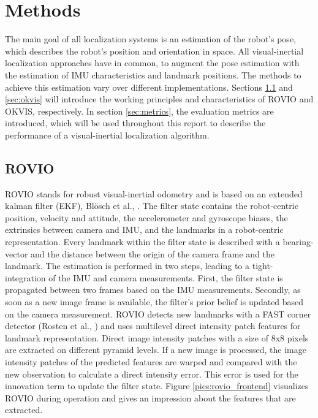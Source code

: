 \chapter{Methods}
\label{sec:methods}

The main goal of all localization systems is an estimation of the robot's pose, which describes the robot's position and orientation in space. All visual-inertial localization approaches have in common, to augment the pose estimation with the estimation of IMU characteristics and landmark positions. The methods to achieve this estimation vary over different implementations. Sections \ref{sec:rovio} and \ref{sec:okvis} will introduce the working principles and characteristics of ROVIO and OKVIS, respectively. In section \ref{sec:metrics}, the evaluation metrics are introduced, which will be used throughout this report to describe the performance of a visual-inertial localization algorithm.

\section{ROVIO}
\label{sec:rovio}

ROVIO stands for robust visual-inertial odometry and is based on an extended kalman filter (EKF), Blösch et al., \cite{bloeschrobust}. The filter state contains the robot-centric position, velocity and attitude, the accelerometer and gyroscope biases, the extrinsics between camera and IMU, and the landmarks in a robot-centric representation. Every landmark within the filter state is described with a bearing-vector and the distance between the origin of the camera frame and the landmark. The estimation is performed in two steps, leading to a tight-integration of the IMU and camera measurements. First, the filter state is propagated between two frames based on the IMU measurements. Secondly, as soon as a new image frame is available, the filter's prior belief is updated based on the camera measurement. ROVIO detects new landmarks with a FAST corner detector (Rosten et al., \cite{rosten2006machine}) and uses multilevel direct intensity patch features for landmark representation. Direct image intensity patches with a size of 8x8 pixels are extracted on different pyramid levels. If a new image is processed, the image intensity patches of the predicted features are warped and compared with the new observation to calculate a direct intensity error. This error is used for the innovation term to update the filter state. Figure \ref{pics:rovio_frontend} visualizes ROVIO during operation and gives an impression about the features that are extracted. \\

